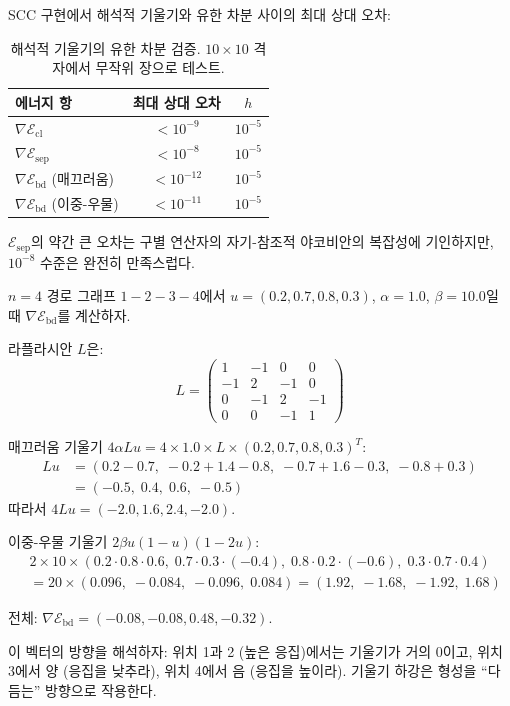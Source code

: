SCC 구현에서 해석적 기울기와 유한 차분 사이의 최대 상대 오차:

\begin{table}[h]
\centering
\begin{tabular}{lcc}
\hline
\textbf{에너지 항} & \textbf{최대 상대 오차} & $h$ \\
\hline
$\nabla \mathcal{E}_{\mathrm{cl}}$ & $< 10^{-9}$ & $10^{-5}$ \\
$\nabla \mathcal{E}_{\mathrm{sep}}$ & $< 10^{-8}$ & $10^{-5}$ \\
$\nabla \mathcal{E}_{\mathrm{bd}}$ (매끄러움) & $< 10^{-12}$ & $10^{-5}$ \\
$\nabla \mathcal{E}_{\mathrm{bd}}$ (이중-우물) & $< 10^{-11}$ & $10^{-5}$ \\
\hline
\end{tabular}
\caption{해석적 기울기의 유한 차분 검증. $10 \times 10$ 격자에서 무작위 장으로 테스트.}
\label{tab:gradient-verification}
\end{table}

$\mathcal{E}_{\mathrm{sep}}$의 약간 큰 오차는 구별 연산자의 자기-참조적 야코비안의 복잡성에 기인하지만, $10^{-8}$ 수준은 완전히 만족스럽다.

\begin{example}
$n = 4$ 경로 그래프 $1-2-3-4$에서 $u = (0.2, 0.7, 0.8, 0.3)$, $\alpha = 1.0$, $\beta = 10.0$일 때 $\nabla \mathcal{E}_{\mathrm{bd}}$를 계산하자.

라플라시안 $L$은:
\[
L = \begin{pmatrix} 1 & -1 & 0 & 0 \\ -1 & 2 & -1 & 0 \\ 0 & -1 & 2 & -1 \\ 0 & 0 & -1 & 1 \end{pmatrix}
\]

매끄러움 기울기 $4\alpha L u = 4 \times 1.0 \times L \times (0.2, 0.7, 0.8, 0.3)^T$:
\begin{align}
    Lu &= (0.2 - 0.7,\; -0.2 + 1.4 - 0.8,\; -0.7 + 1.6 - 0.3,\; -0.8 + 0.3) \\
    &= (-0.5,\; 0.4,\; 0.6,\; -0.5)
\end{align}
따라서 $4Lu = (-2.0, 1.6, 2.4, -2.0)$.

이중-우물 기울기 $2\beta u(1-u)(1-2u)$:
\begin{align}
    &2 \times 10 \times (0.2 \cdot 0.8 \cdot 0.6,\; 0.7 \cdot 0.3 \cdot (-0.4),\; 0.8 \cdot 0.2 \cdot (-0.6),\; 0.3 \cdot 0.7 \cdot 0.4) \\
    &= 20 \times (0.096,\; -0.084,\; -0.096,\; 0.084) = (1.92,\; -1.68,\; -1.92,\; 1.68)
\end{align}

전체: $\nabla \mathcal{E}_{\mathrm{bd}} = (-0.08, -0.08, 0.48, -0.32)$.

이 벡터의 방향을 해석하자: 위치 1과 2 (높은 응집)에서는 기울기가 거의 0이고, 위치 3에서 양 (응집을 낮추라), 위치 4에서 음 (응집을 높이라). 기울기 하강은 형성을 ``다듬는'' 방향으로 작용한다.
\end{example}

